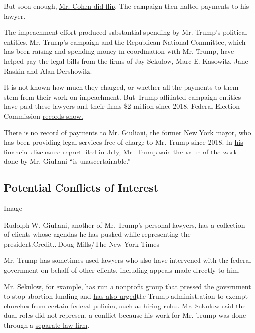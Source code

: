 But soon enough,
\href{https://www.nytimes3xbfgragh.onion/2019/02/27/us/politics/michael-cohen-trump.html}{Mr.
Cohen did flip}. The campaign then halted payments to his lawyer.

The impeachment effort produced substantial spending by Mr. Trump's
political entities. Mr. Trump's campaign and the Republican National
Committee, which has been raising and spending money in coordination
with Mr. Trump, have helped pay the legal bills from the firms of Jay
Sekulow, Marc E. Kasowitz, Jane Raskin and Alan Dershowitz.

It is not known how much they charged, or whether all the payments to
them stem from their work on impeachment. But Trump-affiliated campaign
entities have paid these lawyers and their firms \$2 million since 2018,
Federal Election Commission
\href{https://www.fec.gov/data/disbursements/?data_type=processed\&committee_id=C00003418\&committee_id=C00580100\&committee_id=C00637512\&recipient_name=CONSTITUTIONAL+LITIGATION\&recipient_name=Raskin\&recipient_name=alan+dershowitz\&recipient_name=kasowitz\&two_year_transaction_period=2020\&two_year_transaction_period=2018\&min_date=07\%2F01\%2F2018\&max_date=09\%2F02\%2F2020}{records
show.}

There is no record of payments to Mr. Giuliani, the former New York
mayor, who has been providing legal services free of charge to Mr. Trump
since 2018. In
\href{https://assets.documentcloud.org/documents/7011742/Trump-Donald-J-2020Annual-278.pdf}{his
financial disclosure report} filed in July, Mr. Trump said the value of
the work done by Mr. Giuliani ``is unascertainable.''

\hypertarget{potential-conflicts-of-interest}{%
\subsection{Potential Conflicts of
Interest}\label{potential-conflicts-of-interest}}

Image

Rudolph W. Giuliani, another of Mr. Trump's personal lawyers, has a
collection of clients whose agendas he has pushed while representing the
president.Credit...Doug Mills/The New York Times

Mr. Trump has sometimes used lawyers who also have intervened with the
federal government on behalf of other clients, including appeals made
directly to him.

Mr. Sekulow, for example,
\href{https://static.aclj.org/2019-ACLJ-AR.pdf}{has run a nonprofit
group} that pressed the government to stop abortion funding and
\href{https://aclj.org/religious-liberty/radio-recap-trump-admin-stop-government-discrimination-of-religion}{has
also urged}the Trump administration to exempt churches from certain
federal policies, such as hiring rules. Mr. Sekulow said the dual roles
did not represent a conflict because his work for Mr. Trump was done
through a
\href{https://www.supremecourt.gov/DocketPDF/19/19-635/127982/20200108154615118_Vance\%20Blanket\%20Consent.pdf}{separate
law firm}.

